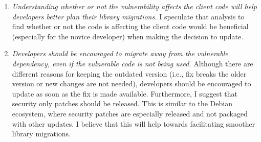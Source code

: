 \begin{enumerate}
    \item \textit{Understanding whether or not the vulnerability affects the client code will help developers better plan their library migrations.}
    I speculate that analysis to find whether or not the code is affecting the client code would be beneficial (especially for the novice developer) when making the decision to update. 

    \item \textit{Developers should be encouraged to migrate away from the vulnerable dependency, even if the vulnerable code is not being used.}
    Although there are different reasons for keeping the outdated version (i.e., fix breaks the older version or new changes are not needed), developers should be encouraged to update as soon as the fix is made available.
    Furthermore, I suggest that security only patches should be released.
    This is similar to the Debian ecosystem, where security patches are especially released and not packaged with other updates.
    I believe that this will help towards facilitating smoother library migrations.
\end{enumerate}
